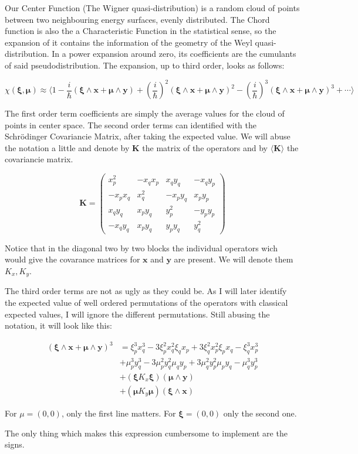 \documentclass[a4paper,12pt]{article}
\newcommand{\ihb}{\frac{i}{\hbar}}
\newcommand{\xfase}{\mathbf{x}}
\newcommand{\yfase}{\mathbf{y}}
\newcommand{\xifase}{ {\boldsymbol{\xi}} }
\newcommand{\mufase}{ {\boldsymbol{\mu}} }
\newcommand{\KovM}{\mathbf{K}}
\begin{document}
Our Center Function (The Wigner quasi-distribution) is a random
cloud of points between two neighbouring energy surfaces, evenly
distributed. The Chord function is also the
a Characteristic Function in the statistical sense, so the
expansion of it contains the information of the geometry of
the Weyl quasi-distribution. In a power expansion around zero,
its coefficients are the cumulants of said
pseudodistribution. The expansion, up to third
order, looks as follows:

\begin{equation}
\chi(\xifase,\mufase)\approx 
\langle 1-\ihb (\xifase\wedge\xfase+\mufase\wedge\yfase)
+\left(\ihb\right)^2(\xifase\wedge\xfase+\mufase\wedge\yfase)^2
-\left(\ihb\right)^3(\xifase\wedge\xfase+\mufase\wedge\yfase)^3
+\cdots\rangle
\end{equation}

The first order term coefficients are simply the average values for
the cloud of points in center space. The second order terms can
identified with the Schr\"odinger Covariancie Matrix, after
taking the expected value. We will abuse the notation a little
and denote by $\KovM$ the matrix of the operators and by
$\langle \KovM \rangle$ the covariancie matrix.

\begin{equation}
\KovM=\left( 
\begin{array}{cccc}
x_p^2   & -x_qx_p & x_qy_q & -x_qy_p \\
-x_px_q & x_q^2 & -x_py_q&  x_py_p \\
x_qy_q & x_py_q & y_p^2    & -y_py_p  \\
-x_qy_q & x_py_q & y_py_q  & y_q^2
 \end{array} 
\right)
\end{equation}

Notice that in the diagonal two by two blocks the individual
operators wich would give
the covarance matrices for $\xfase$ and $\yfase$ are present. We
will denote them $K_x, K_y$. 

The third order terms are not as ugly as they could be. As I will
later identify the expected value of well ordered permutations
of the operators with classical expected values, I will ignore
the different permutations. Still abusing the notation, it 
will look like this:

\begin{equation}
\begin{split}
(\xifase\wedge\xfase+\mufase\wedge\yfase)^3 &=
\xi_p^3x_q^3-3\xi_p^2x_q^2\xi_qx_p +3\xi_q^2x_p^2\xi_px_q-\xi_q^3x_p^3\\
&+\mu_p^3y_q^3-3\mu_p^2y_q^2\mu_qy_p +3\mu_q^2y_p^2\mu_py_q-\mu_q^3y_p^3\\
&+(\xifase K_x\xifase) (\mufase\wedge \yfase)\\
&+(\mufase K_y\mufase) (\xifase\wedge \xfase)
\end{split}
\end{equation}

For $\mu=(0,0)$, only the first line matters. For $\xifase=(0,0)$ only
the second one. 

The only thing which makes this expression cumbersome to implement
are the signs. 


\end{document}
